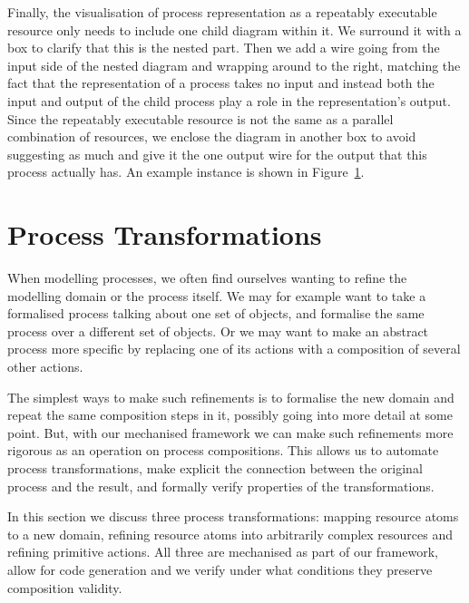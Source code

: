 \documentclass[class=smolathesis,crop=false]{standalone}
\begin{document}
\cbstart
Finally, the visualisation of process representation as a repeatably executable resource only needs to include one child diagram within it.
We surround it with a box to clarify that this is the nested part.
Then we add a wire going from the input side of the nested diagram and wrapping around to the right, matching the fact that the representation of a process takes no input and instead both the input and output of the child process play a role in the representation's output.
Since the repeatably executable resource is not the same as a parallel combination of resources, we enclose the diagram in another box to avoid suggesting as much and give it the one output wire for the output that this process actually has.
An example instance is shown in Figure~\ref{fig:process-diagrams/Represent}.
\cbend

\begin{figure}[h]
  \centering
  
  \caption{}
  \label{fig:process-diagrams/Represent}
\end{figure}

\section{Process Transformations}
\label{sec:proc/transform}

When modelling processes, we often find ourselves wanting to refine the modelling domain or the process itself.
We may for example want to take a formalised process talking about one set of objects, and formalise the same process over a different set of objects.
Or we may want to make an abstract process more specific by replacing one of its actions with a composition of several other actions.

The simplest ways to make such refinements is to formalise the new domain and repeat the same composition steps in it, possibly going into more detail at some point.
But, with our mechanised framework we can make such refinements more rigorous as an operation on process compositions.
This allows us to automate process transformations, make explicit the connection between the original process and the result, and formally verify properties of the transformations.

In this section we discuss three process transformations: mapping resource atoms to a new domain, refining resource atoms into arbitrarily complex resources and refining primitive actions.
All three are mechanised as part of our framework, allow for code generation and we verify under what conditions they preserve composition validity.
\end{document}
